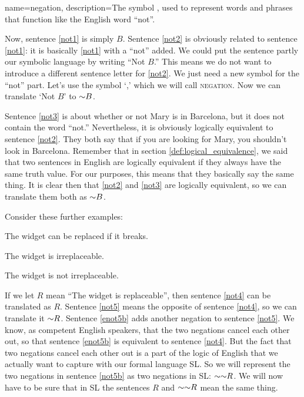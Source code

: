 {
name=negation,
description={The symbol \enot, used to represent words and phrases that function like the English word ``not''.}
}

Now, sentence \ref{not1} is simply $B$. Sentence \ref{not2} is obviously related to sentence \ref{not1}: it is basically \ref{not1} with a ``not'' added. We could put the sentence partly our symbolic language by writing ``Not $B$.'' This means we do not want to introduce a different sentence letter for \ref{not2}. We just need a new symbol for the ``not'' part. Let's use the symbol `\enot,' which we will call \textsc{\gls{negation}}. \label{def:negation} Now we can translate `Not $B$' to $\mathord{\sim} B$.

Sentence \ref{not3} is about whether or not Mary is in Barcelona, but it does not contain the word ``not.'' Nevertheless, it is obviously logically equivalent to sentence \ref{not2}. They both say that if you are looking for Mary, you shouldn't look in Barcelona. Remember that in section \ref{def:logical_equivalence}, we said that two sentences in English are logically equivalent if they always have the same truth value. For our purposes, this means that they basically say the same thing. It is clear then that \ref{not2} and \ref{not3} are logically equivalent, so we can translate them both as $\mathord{\sim} B$.



Consider these further examples:
\begin{earg}
\item[\ex{not4}] The widget can be replaced if it breaks.
\item[\ex{not5}] The widget is irreplaceable.
\item[\ex{not5b}] The widget is not irreplaceable.
\end{earg}


If we let $R$ mean ``The widget is replaceable'', then sentence \ref{not4} can be translated as $R$. Sentence \ref{not5} means the opposite of sentence \ref{not4}, so we can translate it $\mathord{\sim} R$. Sentence \ref{enot5b} adds another negation to sentence \ref{not5}. We know, as competent English speakers, that the two negations cancel each other out, so that sentence \ref{enot5b} is equivalent to sentence \ref{not4}. But the fact that two negations cancel each other out is a part of the logic of English that we actually want to capture with our formal language SL. So we will represent the two negations in sentence \ref{not5b} as two negations in SL: $\mathord{\sim} \mathord{\sim} R$. We will now have to be sure that in SL the sentences $R$ and $\mathord{\sim} \mathord{\sim} R$ mean the same thing.

